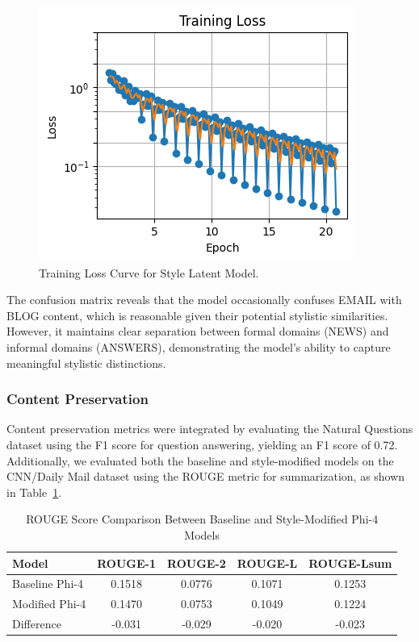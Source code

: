 \documentclass[twocolumn]{article}
\begin{document}
\begin{figure}
    \centering
    \includegraphics[width=0.9\linewidth]{figures/training-loss2.png}
    \caption{Training Loss Curve for Style Latent Model.}
    \label{fig:training-loss}
\end{figure}

The confusion matrix reveals that the model occasionally confuses EMAIL with BLOG content, which is reasonable given their potential stylistic similarities. However, it maintains clear separation between formal domains (NEWS) and informal domains (ANSWERS), demonstrating the model's ability to capture meaningful stylistic distinctions.

\subsubsection{Content Preservation}
Content preservation metrics were integrated by evaluating the Natural Questions dataset using the F1 score for question answering, yielding an F1 score of 0.72. Additionally, we evaluated both the baseline and style-modified models on the CNN/Daily Mail dataset using the ROUGE metric for summarization, as shown in Table~\ref{tab:rouge-scores}.

\begin{table}[ht]
\centering
\caption{ROUGE Score Comparison Between Baseline and Style-Modified Phi-4 Models}
\label{tab:rouge-scores}
\begin{tabular}{lcccc}
\hline
\textbf{Model} & \textbf{ROUGE-1} & \textbf{ROUGE-2} & \textbf{ROUGE-L} & \textbf{ROUGE-Lsum} \\
\hline
Baseline Phi-4 & 0.1518 & 0.0776 & 0.1071 & 0.1253 \\
Modified Phi-4 & 0.1470 & 0.0753 & 0.1049 & 0.1224 \\
Difference  & -0.031 & -0.029 & -0.020 & -0.023 \\
\hline
\end{tabular}
\end{table}
\end{document}
